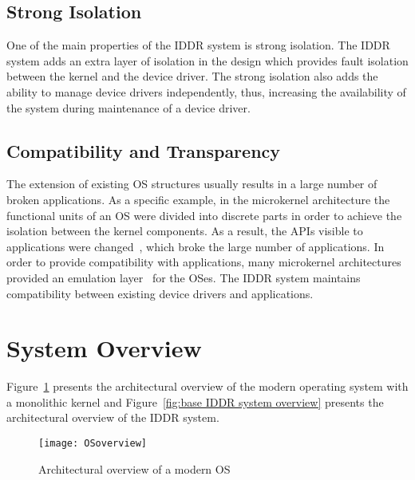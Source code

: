 \subsection*{Strong Isolation}
One of the main properties of the IDDR system is strong isolation. The IDDR system adds an extra layer of isolation in the design which provides fault isolation between the kernel and the device driver. The strong isolation also adds the ability to manage device drivers independently, thus, increasing the availability of the system during maintenance of a device driver.

\subsection*{Compatibility and Transparency} 
The extension of existing OS structures usually results in a large number of broken applications. As a specific example, in the microkernel architecture the functional units of an OS were divided into discrete parts in order to achieve the isolation between the kernel components. As a result, the APIs visible to applications were changed~\cite{hand2005virtual}, which broke the large number of applications. In order to provide compatibility with applications, many microkernel architectures provided an emulation layer~\cite{hand2005virtual} for the OSes. The IDDR system maintains compatibility between existing device drivers and applications.

\section{System Overview}\label{overview}

Figure~\ref{fig:monolithic} presents the architectural overview of the modern operating system with a monolithic kernel and Figure~\ref{fig:base IDDR system overview} presents the architectural overview of the IDDR system.
\\[3mm]
\begin{figure}[!ht]
\centering
\texttt{[image: OSoverview]}
\caption{Architectural overview of a modern OS}
\label{fig:monolithic}
\end{figure}

